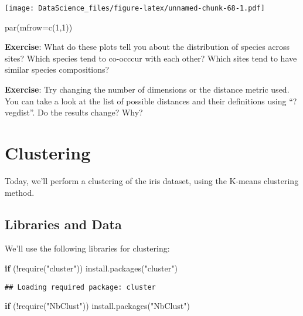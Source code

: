 \documentclass[
]{book}
\newenvironment{Shaded}{\begin{snugshade}}{\end{snugshade}}
\newcommand{\AttributeTok}[1]{\textcolor[rgb]{0.77,0.63,0.00}{#1}}
\newcommand{\ControlFlowTok}[1]{\textcolor[rgb]{0.13,0.29,0.53}{\textbf{#1}}}
\newcommand{\DecValTok}[1]{\textcolor[rgb]{0.00,0.00,0.81}{#1}}
\newcommand{\FunctionTok}[1]{\textcolor[rgb]{0.00,0.00,0.00}{#1}}
\newcommand{\NormalTok}[1]{#1}
\newcommand{\SpecialCharTok}[1]{\textcolor[rgb]{0.00,0.00,0.00}{#1}}
\newcommand{\StringTok}[1]{\textcolor[rgb]{0.31,0.60,0.02}{#1}}
\begin{document}
\texttt{[image: DataScience\_files/figure-latex/unnamed-chunk-68-1.pdf]}

\begin{Shaded}
\begin{Highlighting}[]
\FunctionTok{par}\NormalTok{(}\AttributeTok{mfrow=}\FunctionTok{c}\NormalTok{(}\DecValTok{1}\NormalTok{,}\DecValTok{1}\NormalTok{))}
\end{Highlighting}
\end{Shaded}

\textbf{Exercise}: What do these plots tell you about the distribution of species across sites? Which species tend to co-occcur with each other? Which sites tend to have similar species compositions?

\textbf{Exercise}: Try changing the number of dimensions or the distance metric used. You can take a look at the list of possible distances and their definitions using ``?vegdist''. Do the results change? Why?

\hypertarget{clustering}{%
\chapter{Clustering}\label{clustering}}

Today, we'll perform a clustering of the iris dataset, using the K-means clustering method.

\hypertarget{libraries-and-data-1}{%
\section{Libraries and Data}\label{libraries-and-data-1}}

We'll use the following libraries for clustering:

\begin{Shaded}
\begin{Highlighting}[]
\ControlFlowTok{if}\NormalTok{ (}\SpecialCharTok{!}\FunctionTok{require}\NormalTok{(}\StringTok{"cluster"}\NormalTok{)) }\FunctionTok{install.packages}\NormalTok{(}\StringTok{"cluster"}\NormalTok{)}
\end{Highlighting}
\end{Shaded}

\begin{verbatim}
## Loading required package: cluster
\end{verbatim}

\begin{Shaded}
\begin{Highlighting}[]
\ControlFlowTok{if}\NormalTok{ (}\SpecialCharTok{!}\FunctionTok{require}\NormalTok{(}\StringTok{"NbClust"}\NormalTok{)) }\FunctionTok{install.packages}\NormalTok{(}\StringTok{"NbClust"}\NormalTok{)}
\end{Highlighting}
\end{Shaded}
\end{document}
